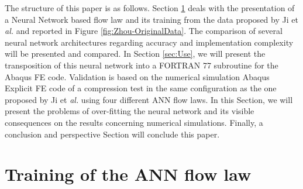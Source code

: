 \documentclass[algorithms,article,submit,pdftex,moreauthors]{Definitions/mdpi}
\makeatletter
\DeclareRobustCommand{\eal}{et \emph{al.}\@\xspace}
\makeatother
\begin{document}
The structure of this paper is as follows.
Section \ref{sec:Training} deals with the presentation of a Neural Network based flow law and its training from the data proposed by Ji \eal \cite{Ji-2018} and reported in Figure \ref{fig:Zhou-OriginalData}.
The comparison of several neural network architectures regarding accuracy and implementation complexity will be presented and compared.
In Section \ref{sec:Use}, we will present the transposition of this neural network into a FORTRAN 77 subroutine for the Abaqus FE code.
Validation is based on the numerical simulation Abaqus Explicit FE code of a compression test in the same configuration as the one proposed by Ji \eal \cite{Ji-2018} using four different ANN flow laws.
In this Section, we will present the problems of over-fitting the neural network and its visible consequences on the results concerning numerical simulations.
Finally, a conclusion and perspective Section will conclude this paper.

\section{Training of the ANN flow law}\label{sec:Training}
\end{document}
